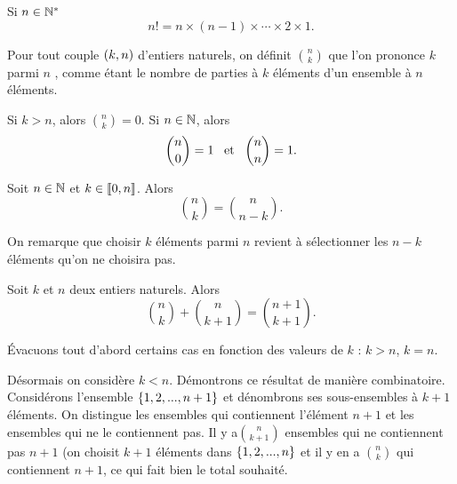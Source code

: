 \documentclass{magnolia}
\begin{document}
\begin{remarqueUnique}
\remarque Si $n\in{\mathbb{N}^*}$
  \[n!=n\times(n-1)\times\cdots\times 2\times 1.\]
\end{remarqueUnique}

\begin{definition}[utile=-3]
Pour tout couple $\left(k,n\right)$ d'entiers naturels, on définit $\binom{n}{k}$ que l'on prononce \og $k$ parmi $n$ \fg, comme étant le nombre de parties à $k$ éléments d'un ensemble
à $n$ éléments.
\end{definition}

\begin{remarques}
\remarque Si $k>n$, alors $\binom{n}{k}=0$.
\remarque Si $n\in\mathbb{N}$, alors
\[\binom{n}{0}=1 \quad\!\text{et}\quad\! \binom{n}{n}=1.\]
\end{remarques}

\begin{proposition}[utile=-3]
Soit $n\in\mathbb{N}$ et $k\in\left\llbracket 0,n\right\rrbracket$. Alors
\[\binom{n}{k}=\binom{n}{n-k}.\]
\end{proposition}

\begin{preuve}
On remarque que choisir $k$ éléments parmi $n$ revient à sélectionner les $n-k$ éléments qu'on ne choisira pas.\end{preuve}

\begin{proposition}[utile=2, nom=Relation de \nom{Pascal}]
Soit $k$ et $n$ deux entiers naturels. Alors
\[\binom{n}{k}+\binom{n}{k+1}=\binom{n+1}{k+1}.\]
\end{proposition}

\begin{preuve}
\'Evacuons tout d'abord certains cas en fonction des valeurs de $k$ : $k>n$, $k=n$.

Désormais on considère $k<n$. Démontrons ce résultat de manière combinatoire. Considérons l'ensemble $\left\{1, 2, . . . ,n+1\right\}$ et dénombrons ses sous-ensembles à $k+1$ éléments. On distingue les ensembles qui contiennent l'élément $n+1$ et les ensembles qui ne le contiennent pas. Il y a$\binom{n}{k+1}$ ensembles qui ne contiennent pas $n+1$ (on choisit $k+1$ éléments dans $\left\{1, 2, . . . ,n\right\}$ et il y en a $\binom{n}{k}$ qui contiennent $n+1$, ce qui fait bien le total souhaité.

\end{preuve}
\end{document}
